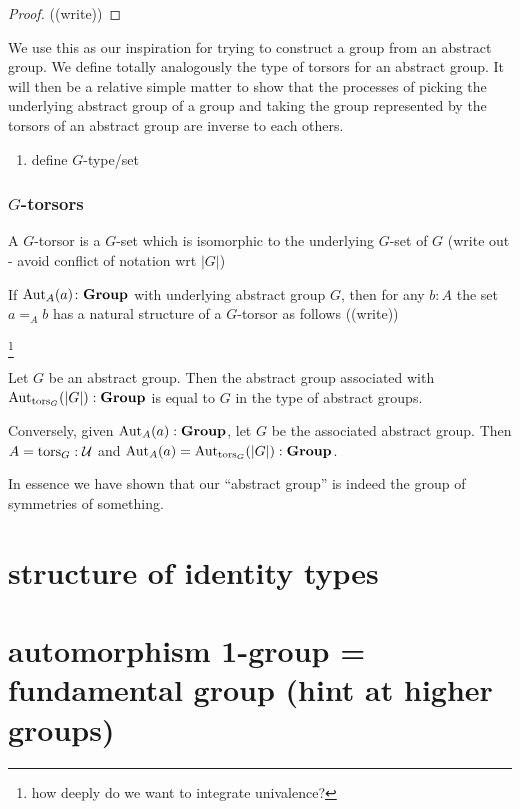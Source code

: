 \begin{proof}
  ((write))
\end{proof}

We use this as our inspiration for trying to construct a group from an abstract group.  We define totally analogously the type of torsors for an abstract group.  It will then be a relative simple matter to show that the processes of picking the underlying abstract group of a group and taking the group represented by the torsors of an abstract group are inverse to each others.
\begin{enumerate}
\item define $G$-type/set
\end{enumerate}
\subsubsection{$G$-torsors}
\label{sec:Gtorsors}
\begin{definition}
  A $G$-torsor is a $G$-set which is isomorphic to the underlying $G$-set of $G$ (write out - avoid conflict of notation wrt $|G|$)
\end{definition}
\begin{example}
  If $\mathrm{Aut}_A(a)\colon\mathbf{Group}$ with underlying abstract group $G$, then for any $b:A$ the set $a=_Ab$ has a natural structure of a $G$-torsor as follows ((write))
\end{example}

\footnote{how deeply do we want to integrate univalence?}
\begin{lemma}
  \label{lem:Groupsareidentitytypes}Let $G$ be an abstract group.  Then the abstract group associated with $\mathrm{Aut}_{\mathrm{tors}_G}(|G|):\mathbf{Group}$ is equal to $G$ in the type of abstract groups.

Conversely, given $\mathrm{Aut}_A(a):\mathbf{Group}$, let $G$ be the associated abstract group.  Then $A=\mathrm{tors}_G:\mathcal U$ and $\mathrm{Aut}_A(a)=\mathrm{Aut}_{\mathrm{tors}_G}(|G|):\mathbf{Group}$.
\end{lemma}
In essence we have shown that our ``abstract group'' is indeed the group of symmetries of something.

\section{structure of identity types}
\section{automorphism 1-group = fundamental group (hint at higher groups)}
